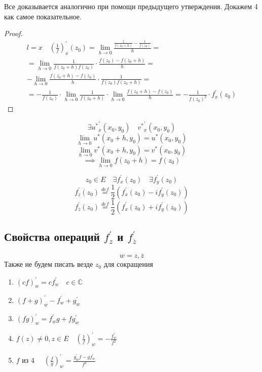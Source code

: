 \documentclass[main]{subfiles}
\begin{document}
Все доказывается аналогично при помощи предыдущего утверждения. Докажем 4 как самое показательное.
\begin{proof}
    \begin{multline*}
        l = x \quad \left(\frac{1}{f}\right)^\prime_x(z_0) = \underset{h \to 0}{\lim} \frac{\frac{1}{f(z_0+h)} - \frac{1}{f(z_0)}}{h} = \\
        = \underset{h \to 0}{\lim} \frac{1}{f(z_0+h)f(z_0)} \cdot \frac{f(z_0) - f(z_0+h)}{h} = \\
         -\underset{h \to 0}{\lim} \frac{f(z_0+h)-f(z_0)}{h} \cdot \frac{1}{f(z_0)f(z_0+h)} = \\
        = -\frac{1}{f(z_0)} \cdot \underset{h \to 0}{\lim} \frac{1}{f(z_0+h)} \cdot \underset{h \to 0}{\lim} \frac{f(z_0+h)-f(z_0)}{h} = - \frac{1}{f(z_0)^2} \cdot f^\prime_x(z_0)
    \end{multline*}
\end{proof}

\[ \exists {u^*}^\prime_x(x_0,y_0) \quad {v^*}^\prime_x(x_0,y_0) \] 
\[\underset{h \to 0}{\lim} u^*(x_0 + h, y_0) = u^*(x_0,y_0) \] 
\[ \underset{h \to 0}{\lim} v^*(x_0 + h, y_0) = v^*(x_0, y_0) \] 
\[ \implies \underset{h \to 0}{\lim} f(z_0 + h) = f(z_0) \]

\begin{theorem}
    \[ z_0 \in E \quad \exists f^\prime_x(z_0) \quad \exists f^\prime_y(z_0) \] 
    \[f^\prime_z (z_0) \stackrel{def}{=} \frac{1}{2} (f^\prime_x(z_0)-if^\prime_y(z_0)) \tag{12} \] 
    \[ f^\prime_{\overline{z}} (z_0) \stackrel{def}{=} \frac{1}{2} ( f^\prime_x(z_0) + if^\prime_y(z_0)) \tag{13} \]
\end{theorem}

\subsection*{Свойства операций $f^\prime_z$ и $f^\prime_{\overline{z}}$}
\[ w = z, \overline{z} \]
Также не будем писать везде $z_0$ для сокращения
\begin{enumerate}
    \item $(cf)^\prime_w = cf^\prime_w \quad c \in \mathbb{C}$
    \item $(f+g)^\prime_w - f^\prime_w + g^\prime_w $ 
    \item $(fg)^\prime_w = f^\prime_w g + f g^\prime_w $
    \item $f(z) \ne 0, z \in E \quad \left(\frac{1}{f}\right)^\prime_w = - \frac{f^\prime_w}{f^2}$
    \item $f$ из 4 $\quad \left(\frac{f}{g}\right)^\prime_w = \frac{g^\prime_w f - g f^\prime_w}{f^2}$
\end{enumerate}
\end{document}
